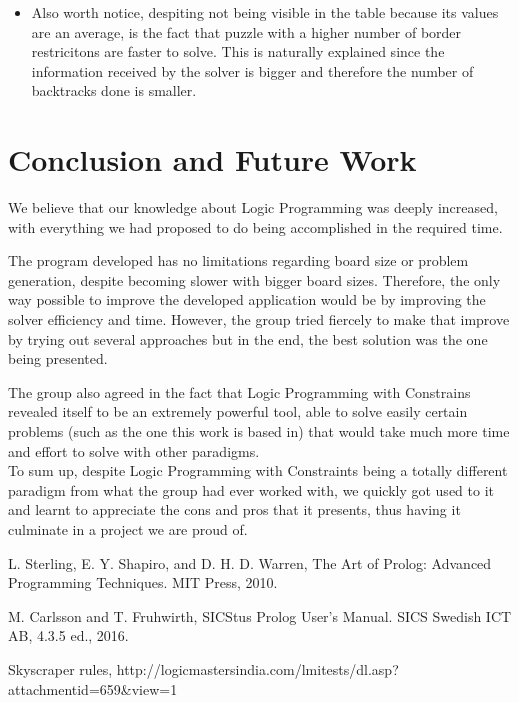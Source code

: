 \documentclass{llncs}
\begin{document}
\begin{itemize}
	\item Also worth notice, despiting not being visible in the table because its values are an average, is the fact that puzzle with a higher number of border restricitons are faster to solve. This is naturally explained since the information received by the solver is bigger and therefore the number of backtracks done is smaller.
\end{itemize}

%
\section{Conclusion and Future Work}

We believe that our knowledge about Logic Programming was deeply increased, with everything we had proposed to do being accomplished in the required time.

The program developed has no limitations regarding board size or problem generation, despite becoming slower with bigger board sizes. Therefore, the only way possible to improve the developed application would be by improving the solver efficiency and time. However, the group tried fiercely to make that improve by trying out several approaches but in the end, the best solution was the one being presented.

The group also agreed in the fact that Logic Programming with Constrains revealed itself to be an extremely powerful tool, able to solve easily certain problems (such as the one this work is based in) that would take much more time and effort to solve with other paradigms.\\

To sum up, despite Logic Programming with Constraints being a totally different paradigm from what the group had ever worked with, we quickly got used to it and learnt to appreciate the cons and pros that it presents, thus having it culminate in a project we are proud of.

%


%
%
\begin{thebibliography}{5}
%
L. Sterling, E. Y. Shapiro, and D. H. D. Warren, The Art of Prolog: Advanced Programming Techniques. MIT Press, 2010.

M. Carlsson and T. Fruhwirth, SICStus Prolog User's Manual. SICS Swedish ICT AB, 4.3.5 ed., 2016.

Skyscraper rules,
http://logicmastersindia.com/lmitests/dl.asp?attachmentid=659\&view=1

\end{thebibliography}
\end{document}
